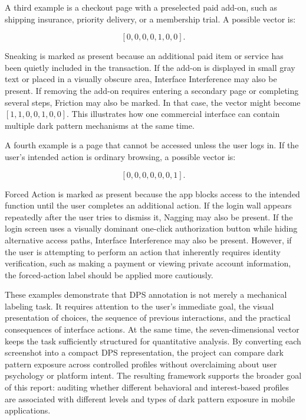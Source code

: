 A third example is a checkout page with a preselected paid add-on, such as shipping insurance, priority delivery, or a membership trial. A possible vector is:

\[
[0, 0, 0, 0, 1, 0, 0].
\]

Sneaking is marked as present because an additional paid item or service has been quietly included in the transaction. If the add-on is displayed in small gray text or placed in a visually obscure area, Interface Interference may also be present. If removing the add-on requires entering a secondary page or completing several steps, Friction may also be marked. In that case, the vector might become \([1, 1, 0, 0, 1, 0, 0]\). This illustrates how one commercial interface can contain multiple dark pattern mechanisms at the same time.

A fourth example is a page that cannot be accessed unless the user logs in. If the user's intended action is ordinary browsing, a possible vector is:

\[
[0, 0, 0, 0, 0, 0, 1].
\]

Forced Action is marked as present because the app blocks access to the intended function until the user completes an additional action. If the login wall appears repeatedly after the user tries to dismiss it, Nagging may also be present. If the login screen uses a visually dominant one-click authorization button while hiding alternative access paths, Interface Interference may also be present. However, if the user is attempting to perform an action that inherently requires identity verification, such as making a payment or viewing private account information, the forced-action label should be applied more cautiously.

These examples demonstrate that DPS annotation is not merely a mechanical labeling task. It requires attention to the user's immediate goal, the visual presentation of choices, the sequence of previous interactions, and the practical consequences of interface actions. At the same time, the seven-dimensional vector keeps the task sufficiently structured for quantitative analysis. By converting each screenshot into a compact DPS representation, the project can compare dark pattern exposure across controlled profiles without overclaiming about user psychology or platform intent. The resulting framework supports the broader goal of this report: auditing whether different behavioral and interest-based profiles are associated with different levels and types of dark pattern exposure in mobile applications.
